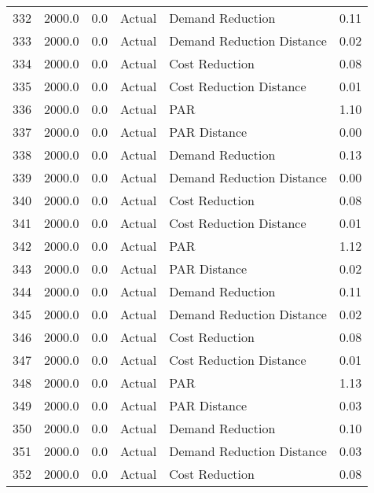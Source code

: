 \begin{longtable}{lrrllr}
332  &       2000.0 &     0.0 &         Actual &           Demand Reduction &   0.11 \\
333  &       2000.0 &     0.0 &         Actual &  Demand Reduction Distance &   0.02 \\
334  &       2000.0 &     0.0 &         Actual &             Cost Reduction &   0.08 \\
335  &       2000.0 &     0.0 &         Actual &    Cost Reduction Distance &   0.01 \\
336  &       2000.0 &     0.0 &         Actual &                        PAR &   1.10 \\
337  &       2000.0 &     0.0 &         Actual &               PAR Distance &   0.00 \\
338  &       2000.0 &     0.0 &         Actual &           Demand Reduction &   0.13 \\
339  &       2000.0 &     0.0 &         Actual &  Demand Reduction Distance &   0.00 \\
340  &       2000.0 &     0.0 &         Actual &             Cost Reduction &   0.08 \\
341  &       2000.0 &     0.0 &         Actual &    Cost Reduction Distance &   0.01 \\
342  &       2000.0 &     0.0 &         Actual &                        PAR &   1.12 \\
343  &       2000.0 &     0.0 &         Actual &               PAR Distance &   0.02 \\
344  &       2000.0 &     0.0 &         Actual &           Demand Reduction &   0.11 \\
345  &       2000.0 &     0.0 &         Actual &  Demand Reduction Distance &   0.02 \\
346  &       2000.0 &     0.0 &         Actual &             Cost Reduction &   0.08 \\
347  &       2000.0 &     0.0 &         Actual &    Cost Reduction Distance &   0.01 \\
348  &       2000.0 &     0.0 &         Actual &                        PAR &   1.13 \\
349  &       2000.0 &     0.0 &         Actual &               PAR Distance &   0.03 \\
350  &       2000.0 &     0.0 &         Actual &           Demand Reduction &   0.10 \\
351  &       2000.0 &     0.0 &         Actual &  Demand Reduction Distance &   0.03 \\
352  &       2000.0 &     0.0 &         Actual &             Cost Reduction &   0.08 \\

\end{longtable}
